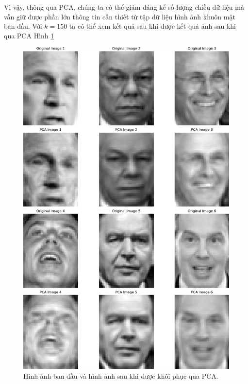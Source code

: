 \documentclass[14pt,oneside,a4paper]{report}
\numberwithin{equation}{section}
\begin{document}
Vì vậy, thông qua PCA, chúng ta có thể giảm đáng kể số lượng chiều dữ liệu mà vẫn giữ được phần lớn thông tin cần thiết từ tập dữ liệu hình ảnh khuôn mặt ban đầu. Với $k =150$ ta có thể xem kết quả sau khi được kết quả ảnh sau khi qua PCA Hình \ref{fig:eigenface}
\begin{figure}[htp]
\centering
\includegraphics[scale=0.62]{eigenface.png}
\caption{Hình ảnh ban đầu và hình ảnh sau khi được khôi phục qua PCA.}
\label{fig:eigenface}
\end{figure}
\end{document}
